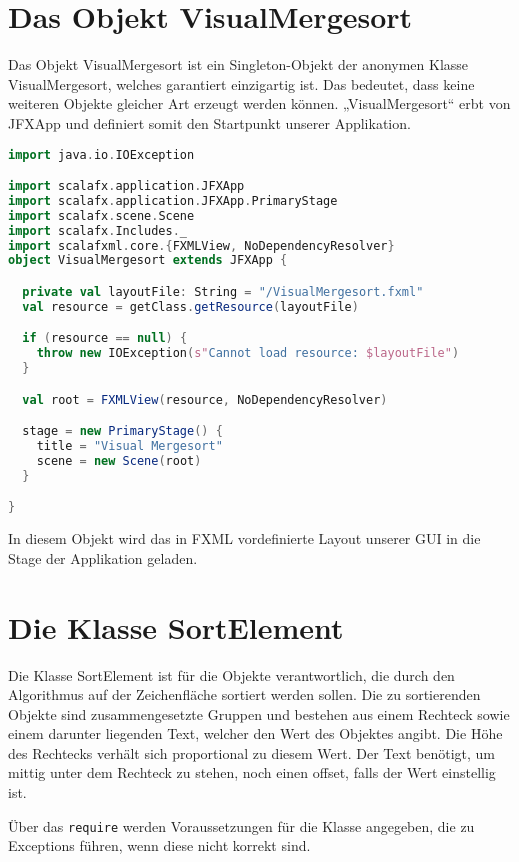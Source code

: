 \section{Das Objekt VisualMergesort}
Das Objekt VisualMergesort ist ein Singleton-Objekt der anonymen Klasse VisualMergesort, welches garantiert einzigartig ist. Das bedeutet, dass keine weiteren Objekte gleicher Art erzeugt werden können. „VisualMergesort“ erbt von JFXApp und definiert somit den Startpunkt unserer Applikation.

\begin{lstlisting}[language=Scala]
import java.io.IOException

import scalafx.application.JFXApp
import scalafx.application.JFXApp.PrimaryStage
import scalafx.scene.Scene
import scalafx.Includes._
import scalafxml.core.{FXMLView, NoDependencyResolver}
object VisualMergesort extends JFXApp {

  private val layoutFile: String = "/VisualMergesort.fxml"
  val resource = getClass.getResource(layoutFile)

  if (resource == null) {
    throw new IOException(s"Cannot load resource: $layoutFile")
  }

  val root = FXMLView(resource, NoDependencyResolver)

  stage = new PrimaryStage() {
    title = "Visual Mergesort"
    scene = new Scene(root)
  }

}
\end{lstlisting}

In diesem Objekt wird das in FXML vordefinierte Layout unserer GUI in die Stage der Applikation geladen.

\section{Die Klasse SortElement}
Die Klasse SortElement ist für die Objekte verantwortlich, die durch den Algorithmus auf der Zeichenfläche sortiert werden sollen. Die zu sortierenden Objekte sind zusammengesetzte Gruppen und bestehen aus einem Rechteck sowie einem darunter liegenden Text, welcher den Wert des Objektes angibt. Die Höhe des Rechtecks verhält sich proportional zu diesem Wert.
Der Text benötigt, um mittig unter dem Rechteck zu stehen, noch einen offset, falls der Wert einstellig ist.

Über das \texttt{require} werden Voraussetzungen für die Klasse angegeben, die zu Exceptions führen, wenn diese nicht korrekt sind.

